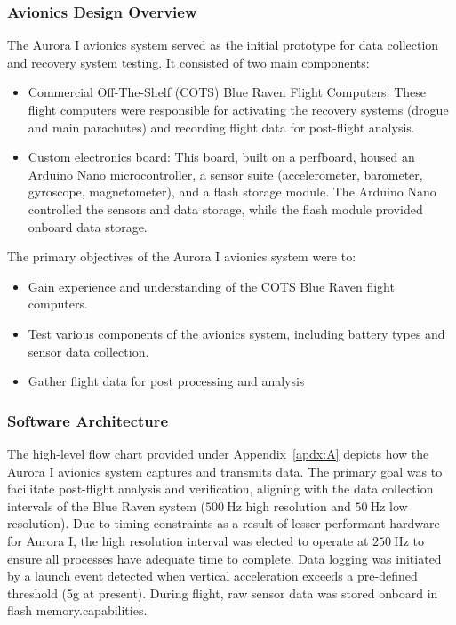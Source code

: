 \subsubsection{Avionics Design Overview}
The Aurora I avionics system served as the initial prototype for data collection and recovery system testing. It consisted of two main components: 
\begin{itemize}
  \item Commercial Off-The-Shelf (COTS) Blue Raven Flight Computers: These flight computers were responsible for activating the recovery systems (drogue and main parachutes) and recording flight data for post-flight analysis. 
  \item Custom electronics board: This board, built on a perfboard, housed an Arduino Nano microcontroller, a sensor suite (accelerometer, barometer, gyroscope, magnetometer), and a flash storage module. The Arduino Nano controlled the sensors and data storage, while the flash module provided onboard data storage. 
\end{itemize}

\noindent The primary objectives of the Aurora I avionics system were to: 
\begin{itemize}
  \item Gain experience and understanding of the COTS Blue Raven flight computers. 
  \item Test various components of the avionics system, including battery types and sensor data collection. 
  \item Gather flight data for post processing and analysis
\end{itemize}

\subsubsection{Software Architecture}
The high-level flow chart provided under Appendix~\ref{apdx:A} depicts how the Aurora I avionics system captures and transmits data. The primary goal was to facilitate post-flight analysis and verification, aligning with the data collection intervals of the Blue Raven system ($\SI{500}{\hertz}$ high resolution and $\SI{50}{\hertz}$ low resolution). Due to timing constraints as a result of lesser performant hardware for Aurora I, the high resolution interval was elected to operate at $\SI{250}{\hertz}$ to ensure all processes have adequate time to complete. Data logging was initiated by a launch event detected when vertical acceleration exceeds a pre-defined threshold (5g at present). During flight, raw sensor data was stored onboard in flash memory.capabilities. 


